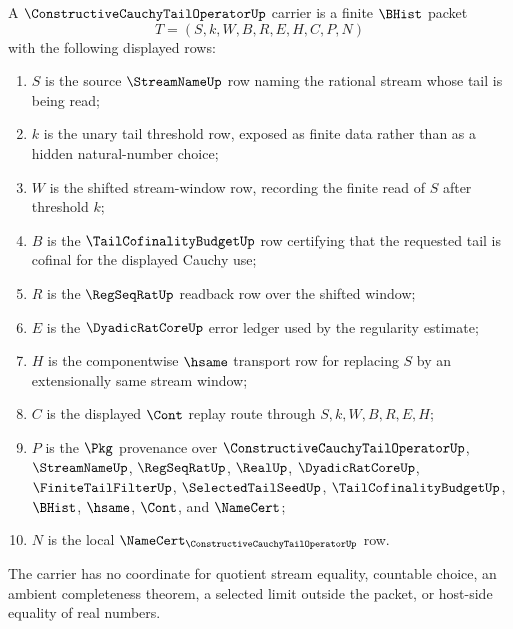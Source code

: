 \begin{definition}
\label{def:constructive-cauchy-tail-operator-carrier}
A $\ConstructiveCauchyTailOperatorUp$ carrier is a finite $\BHist$ packet
$$
T=(S,k,W,B,R,E,H,C,P,N)
$$
with the following displayed rows:
\begin{enumerate}
\item $S$ is the source $\StreamNameUp$ row naming the rational stream whose tail is being read;
\item $k$ is the unary tail threshold row, exposed as finite data rather than as a hidden natural-number choice;
\item $W$ is the shifted stream-window row, recording the finite read of $S$ after threshold $k$;
\item $B$ is the $\TailCofinalityBudgetUp$ row certifying that the requested tail is cofinal for the displayed Cauchy use;
\item $R$ is the $\RegSeqRatUp$ readback row over the shifted window;
\item $E$ is the $\DyadicRatCoreUp$ error ledger used by the regularity estimate;
\item $H$ is the componentwise $\hsame$ transport row for replacing $S$ by an extensionally same stream window;
\item $C$ is the displayed $\Cont$ replay route through $S,k,W,B,R,E,H$;
\item $P$ is the $\Pkg$ provenance over $\ConstructiveCauchyTailOperatorUp$, $\StreamNameUp$, $\RegSeqRatUp$, $\RealUp$, $\DyadicRatCoreUp$, $\FiniteTailFilterUp$, $\SelectedTailSeedUp$, $\TailCofinalityBudgetUp$, $\BHist$, $\hsame$, $\Cont$, and $\NameCert$;
\item $N$ is the local $\NameCert_{\ConstructiveCauchyTailOperatorUp}$ row.
\end{enumerate}
The carrier has no coordinate for quotient stream equality, countable choice, an ambient completeness theorem, a selected limit outside the packet, or host-side equality of real numbers.
\end{definition}

